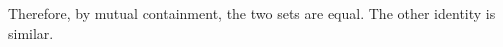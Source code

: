 \documentclass{ibl}  %
\begin{document}
\begin{problem}
\begin{exes}
\begin{answer}
  Therefore, by mutual containment, the two sets are equal.
  The other identity is similar.  
\end{answer}
\end{exes}


  



\end{problem}
\end{document}
